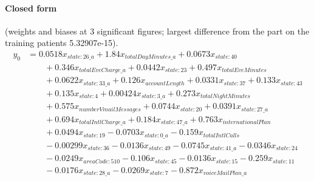 \documentclass[a4paper,10pt]{article}
\newif\ifreviewmarks
\newcommand{\reviewrule}{\noindent{\color{BrickRed}\rule{\linewidth}{0.8pt}}}
\newenvironment{drafted}[1][]{%
  \ifreviewmarks\par\addvspace{\medskipamount}\reviewrule\par\nopagebreak
  \noindent{\color{BrickRed}\sffamily\footnotesize\textbf{Thesis Draft}\quad #1\hfill review}\par\nopagebreak\smallskip\fi}{%
  \ifreviewmarks\par\smallskip\noindent{\color{BrickRed}\sffamily\footnotesize end of thesis draft}\par\nopagebreak\reviewrule\par\medskip\fi}
\begin{document}
\begin{drafted}[plain-language layer: churn100-s2-c2]
\paragraph{Closed form} {\footnotesize(weights and biases at 3 significant figures; largest difference from the part on the training patients 5.32907e-15).}
{\small\begingroup\allowdisplaybreaks
\begin{align*}
y_{0} &= 0.0518 x_{state:26\_a} + 1.84 x_{totalDayMinutes\_a} + 0.0673 x_{state:40} \\
&\qquad + 0.346 x_{totalEveCharge\_a} + 0.0442 x_{state:23} + 0.497 x_{totalEveMinutes} \\
&\qquad + 0.0622 x_{state:33\_a} + 0.126 x_{accountLength} + 0.0331 x_{state:37} + 0.133 x_{state:43} \\
&\qquad + 0.135 x_{state:4} + 0.00424 x_{state:3\_a} + 0.273 x_{totalNightMinutes} \\
&\qquad + 0.575 x_{numberVmailMessages} + 0.0744 x_{state:20} + 0.0391 x_{state:27\_a} \\
&\qquad + 0.694 x_{totalIntlCharge\_a} + 0.184 x_{state:47\_a} + 0.763 x_{internationalPlan} \\
&\qquad + 0.0494 x_{state:19} - 0.0703 x_{state:0\_a} - 0.159 x_{totalIntlCalls} \\
&\qquad - 0.00299 x_{state:36} - 0.0136 x_{state:49} - 0.0745 x_{state:41\_a} - 0.0346 x_{state:24} \\
&\qquad - 0.0249 x_{areaCode:510} - 0.106 x_{state:45} - 0.0136 x_{state:15} - 0.259 x_{state:11} \\
&\qquad - 0.0176 x_{state:28\_a} - 0.0269 x_{state:7} - 0.872 x_{voiceMailPlan\_a}
\end{align*}\endgroup}


\end{drafted}
\end{document}
